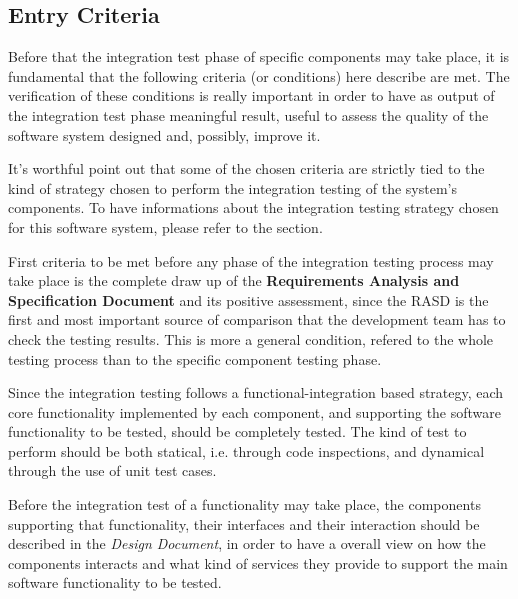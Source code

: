 \subsection{Entry Criteria}

Before that the integration test phase of specific components may take place, it is fundamental that the following criteria (or conditions) here describe are met.
The verification of these conditions is really important in order to have as output of the integration test phase meaningful result, useful to assess the quality of the software system designed and, possibly, improve it.

It's worthful point out that some of the chosen criteria are strictly tied to the kind of strategy chosen to perform the integration testing of the system's components. To have informations about the integration testing strategy chosen for this software system, please refer to the \textit{} section.

First criteria to be met before any phase of the integration testing process may take place is the complete draw up of the \textbf{Requirements Analysis and Specification Document} and its positive assessment, since the RASD is the first and most important source of comparison that the development team has to check the testing results. This is more a general condition, refered to the whole testing process than to the specific component testing phase.

Since the integration testing follows a functional-integration based strategy, each core functionality implemented by each component, and supporting the software functionality to be tested, should be completely tested. The kind of test to perform should be both statical, i.e. through code inspections, and dynamical through the use of unit test cases. 

Before the integration test of a functionality may take place, the components supporting that functionality, their interfaces and their interaction should be described in the \textit{Design Document}, in order to have a overall view on how the components interacts and what kind of services they provide to support the main software functionality to be tested.
